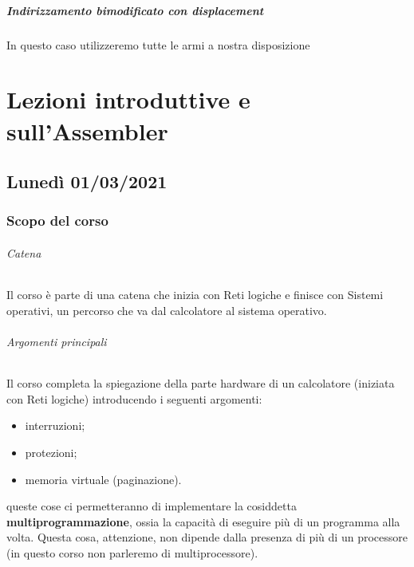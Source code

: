 \documentclass[11pt]{report}
\theoremstyle{definition}
\begin{document}
 \subsubsection*{Indirizzamento bimodificato con displacement}
 In questo caso utilizzeremo tutte le armi a nostra disposizione

\part{Lezioni introduttive e sull'Assembler}

\chapter{Lunedì 01/03/2021}
\section{Scopo del corso}
\paragraph{Catena} Il corso è parte di una catena che inizia con Reti logiche e finisce con Sistemi operativi, un percorso che va dal calcolatore al sistema operativo.
\paragraph{Argomenti principali} Il corso completa la spiegazione della parte hardware di un calcolatore (iniziata con Reti logiche) introducendo i seguenti argomenti:
\begin{itemize}
\item interruzioni;
\item protezioni;
\item memoria virtuale (paginazione).
\end{itemize}
queste cose ci permetteranno di implementare la cosiddetta \textbf{multiprogrammazione}, ossia la capacità di eseguire più di un programma alla volta. Questa cosa, attenzione, non dipende dalla presenza di più di un processore (in questo corso non parleremo di multiprocessore).
\end{document}
